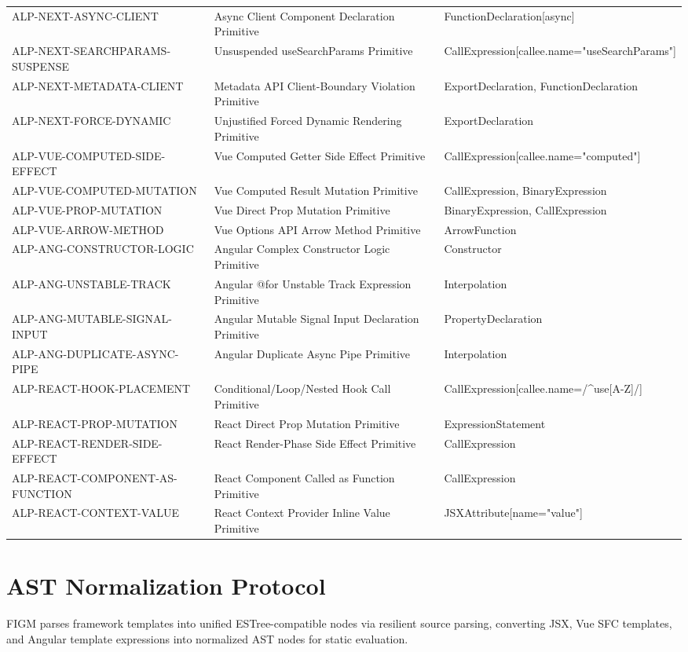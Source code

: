 \begin{table}[htbp]
\begin{tabular}{lll}
ALP-NEXT-ASYNC-CLIENT & Async Client Component Declaration Primitive & FunctionDeclaration[async] \\
ALP-NEXT-SEARCHPARAMS-SUSPENSE & Unsuspended useSearchParams Primitive & CallExpression[callee.name="useSearchParams"] \\
ALP-NEXT-METADATA-CLIENT & Metadata API Client-Boundary Violation Primitive & ExportDeclaration, FunctionDeclaration \\
ALP-NEXT-FORCE-DYNAMIC & Unjustified Forced Dynamic Rendering Primitive & ExportDeclaration \\
ALP-VUE-COMPUTED-SIDE-EFFECT & Vue Computed Getter Side Effect Primitive & CallExpression[callee.name="computed"] \\
ALP-VUE-COMPUTED-MUTATION & Vue Computed Result Mutation Primitive & CallExpression, BinaryExpression \\
ALP-VUE-PROP-MUTATION & Vue Direct Prop Mutation Primitive & BinaryExpression, CallExpression \\
ALP-VUE-ARROW-METHOD & Vue Options API Arrow Method Primitive & ArrowFunction \\
ALP-ANG-CONSTRUCTOR-LOGIC & Angular Complex Constructor Logic Primitive & Constructor \\
ALP-ANG-UNSTABLE-TRACK & Angular @for Unstable Track Expression Primitive & Interpolation \\
ALP-ANG-MUTABLE-SIGNAL-INPUT & Angular Mutable Signal Input Declaration Primitive & PropertyDeclaration \\
ALP-ANG-DUPLICATE-ASYNC-PIPE & Angular Duplicate Async Pipe Primitive & Interpolation \\
ALP-REACT-HOOK-PLACEMENT & Conditional/Loop/Nested Hook Call Primitive & CallExpression[callee.name=/^use[A-Z]/] \\
ALP-REACT-PROP-MUTATION & React Direct Prop Mutation Primitive & ExpressionStatement \\
ALP-REACT-RENDER-SIDE-EFFECT & React Render-Phase Side Effect Primitive & CallExpression \\
ALP-REACT-COMPONENT-AS-FUNCTION & React Component Called as Function Primitive & CallExpression \\
ALP-REACT-CONTEXT-VALUE & React Context Provider Inline Value Primitive & JSXAttribute[name="value"] \\
\bottomrule
\end{tabular}
\end{table}

\section{AST Normalization Protocol}
FIGM parses framework templates into unified ESTree-compatible nodes via resilient source parsing, converting JSX, Vue SFC templates, and Angular template expressions into normalized AST nodes for static evaluation.
